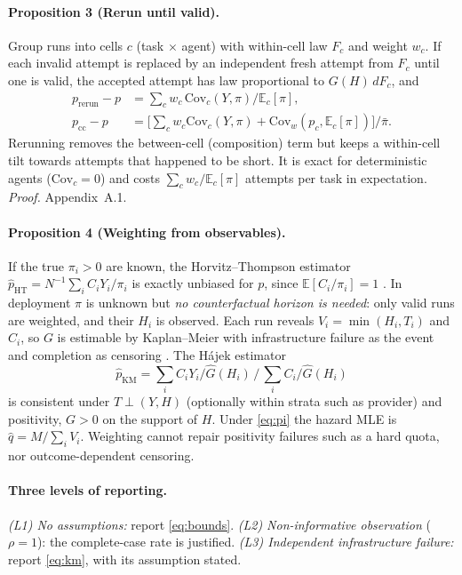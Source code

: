 \documentclass[letterpaper]{article} %
\newcommand{\pb}{\bar\pi}
\begin{document}
\paragraph{Proposition 3 (Rerun until valid).}
Group runs into cells $c$ (task $\times$ agent) with within-cell law $F_c$ and
weight $w_c$. If each invalid attempt is replaced by an independent fresh
attempt from $F_c$ until one is valid, the accepted attempt has law
proportional to $G(H)\,dF_c$, and
\begin{align}
p_{\mathrm{rerun}}-p&=\textstyle\sum_c w_c\,
\mathrm{Cov}_c(Y,\pi)/\mathbb{E}_c[\pi],\label{eq:rerun}\\
p_{\mathrm{cc}}-p&=\big[\textstyle\sum_c w_c\mathrm{Cov}_c(Y,\pi)
+\mathrm{Cov}_w(p_c,\mathbb{E}_c[\pi])\big]/\pb .\nonumber
\end{align}
Rerunning removes the between-cell (composition) term but keeps a within-cell
tilt towards attempts that happened to be short. It is exact for deterministic
agents ($\mathrm{Cov}_c=0$) and costs $\sum_cw_c/\mathbb{E}_c[\pi]$ attempts per
task in expectation. \emph{Proof.} Appendix~A.1.

\paragraph{Proposition 4 (Weighting from observables).}
If the true $\pi_i>0$ are known, the Horvitz--Thompson estimator $\hat
p_{\mathrm{HT}}=N^{-1}\sum_iC_iY_i/\pi_i$ is exactly unbiased for $p$, since
$\mathbb{E}[C_i/\pi_i]=1$
\citep{horvitz1952generalization,robins1994estimation}. In deployment $\pi$ is
unknown but \emph{no counterfactual horizon is needed}: only valid runs are
weighted, and their $H_i$ is observed. Each run reveals $V_i=\min(H_i,T_i)$ and
$C_i$, so $G$ is estimable by Kaplan--Meier with infrastructure failure as the
event and completion as censoring
\citep{kaplan1958nonparametric,robins2000correcting,satten2001kaplan}. The
H\'ajek estimator
\begin{equation}
\hat p_{\mathrm{KM}}=\textstyle\sum_iC_iY_i/\hat G(H_i)\,\big/\,\sum_iC_i/\hat G(H_i)
\label{eq:km}
\end{equation}
is consistent under $T\perp(Y,H)$ (optionally within strata such as provider)
and positivity, $G>0$ on the support of $H$. Under \eqref{eq:pi} the hazard
MLE is $\hat q=M/\sum_iV_i$. Weighting cannot repair positivity failures such as
a hard quota, nor outcome-dependent censoring.

\paragraph{Three levels of reporting.} \emph{(L1) No assumptions:} report
\eqref{eq:bounds}. \emph{(L2) Non-informative observation} ($\rho=1$): the
complete-case rate is justified. \emph{(L3) Independent infrastructure
failure:} report \eqref{eq:km}, with its assumption stated.
\end{document}

